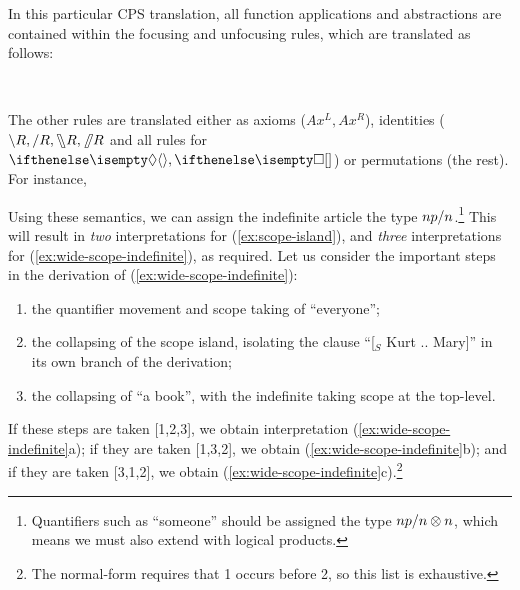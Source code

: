 \documentclass[10pt,a4paper]{llncs}
\begin{document}
In this particular CPS translation, all function applications and
abstractions are contained within the focusing and unfocusing rules,
which are translated as follows:
\begin{center}
  \begin{scprooftree*}
  \end{scprooftree*}
  \begin{scprooftree*}
  \end{scprooftree*}
  \\[1\baselineskip]
  \begin{scprooftree*}
  \end{scprooftree*}
  \begin{scprooftree*}
  \end{scprooftree*}
\end{center}
The other rules are translated either as axioms ($Ax^L,Ax^R$),
identities ($\impr R,\impl R,\himpr R,\himpl R$ and all rules for
$\di,\sq$) or permutations (the rest). For instance,
\begin{scprooftree}
\end{scprooftree}
Using these semantics, we can assign the indefinite article the type
$np \impl n$.\footnote{%
  Quantifiers such as ``someone'' should be assigned the type $np\impl
  n\otimes n$, which means we must also extend {\NLCL} with logical
  products.
}
This will result in \emph{two} interpretations for
(\ref{ex:scope-island}), and \emph{three} interpretations for
(\ref{ex:wide-scope-indefinite}), as required. Let us consider the
important steps in the derivation of (\ref{ex:wide-scope-indefinite}):
\begin{enumerate}
\item the quantifier movement and scope taking of ``everyone'';
\item the collapsing of the scope island, isolating the clause
  ``[$_S$ Kurt .. Mary]'' in its own branch of the derivation;
\item the collapsing of ``a book'', with the indefinite taking scope
  at the top-level.
\end{enumerate}
If these steps are taken [1,2,3], we obtain interpretation
(\ref{ex:wide-scope-indefinite}a); if they are taken [1,3,2], we
obtain (\ref{ex:wide-scope-indefinite}b); and if they are taken
[3,1,2], we obtain (\ref{ex:wide-scope-indefinite}c).\footnote{%
  The normal-form requires that 1 occurs before 2, so this list is
  exhaustive.
}
\end{document}
